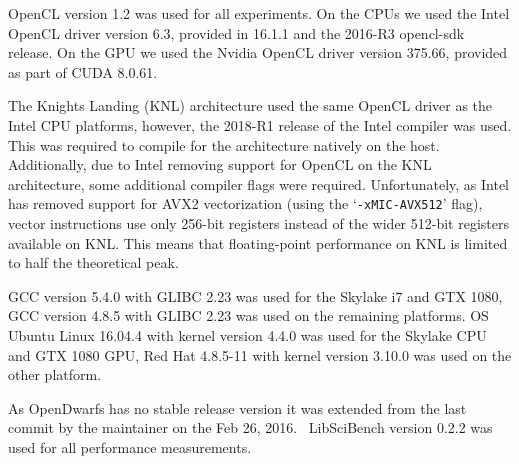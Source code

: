 \documentclass[../document.tex]{subfiles}
\begin{document}
\label{ssec:software}

OpenCL version 1.2 was used for all experiments.
On the CPUs we used the Intel OpenCL driver version 6.3, provided in 16.1.1 and the 2016-R3 opencl-sdk release.
On the GPU we used the Nvidia OpenCL driver version 375.66, provided as part of CUDA 8.0.61.

The Knights Landing (KNL) architecture used the same OpenCL driver as the Intel CPU platforms, however, the 2018-R1 release of the Intel compiler was used.
This was required to compile for the architecture natively on the host.
Additionally, due to Intel removing support for OpenCL on the KNL architecture, some additional compiler flags were required.
Unfortunately, as Intel has removed support for AVX2 vectorization (using the `{\tt -xMIC-AVX512}' flag), vector instructions use only 256-bit registers instead of the wider 512-bit registers available on KNL.
This means that floating-point performance on KNL is limited to half the theoretical peak.

GCC version 5.4.0 with GLIBC 2.23 was used for the Skylake i7 and GTX 1080,  
GCC version 4.8.5 with GLIBC 2.23 was used on the remaining platforms.
OS Ubuntu Linux 16.04.4 with kernel version 4.4.0 was used for the Skylake CPU and GTX 1080 GPU, Red Hat 4.8.5-11 with kernel version 3.10.0 was used on the other platform.

As OpenDwarfs has no stable release version it was extended from the last commit by the maintainer on the Feb 26, 2016.~\cite{opendwarfs2017base}
LibSciBench version 0.2.2 was used for all performance measurements.
\end{document}
